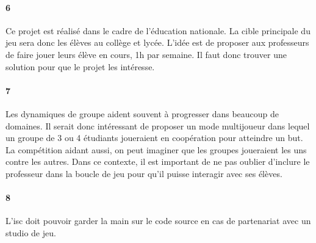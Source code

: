 \paragraph{6}Ce projet est réalisé dans le cadre de l'éducation nationale. La cible principale du jeu sera donc les élèves au collège et lycée. L'idée est de proposer aux professeurs de
faire jouer leurs élève en cours, 1h par semaine. Il faut donc trouver une solution pour que le projet les intéresse.
\paragraph{7}Les dynamiques de groupe aident souvent à progresser dans beaucoup de domaines. Il serait donc intéressant de proposer un mode multijoueur dans lequel un groupe de 3 ou 4
étudiants joueraient en coopération pour atteindre un but. La compétition aidant aussi, on peut imaginer que les groupes joueraient les uns contre les autres. Dans ce contexte, il est
important de ne pas oublier d'inclure le professeur dans la boucle de jeu pour qu'il puisse interagir avec ses élèves.
\paragraph{8}L'\gls{isc} doit pouvoir garder la main sur le code source en cas de partenariat avec un studio de jeu.